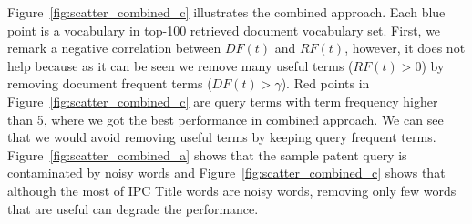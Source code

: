 Figure~\ref{fig:scatter_combined_c} illustrates the combined approach. Each blue point is a vocabulary in top-100 retrieved document vocabulary set. First, we remark a negative correlation between $\mathit{DF(t)}$ and $\mathit{RF(t)}$, however, it does not help because as it can be seen we remove many useful terms ($RF(t)>0$) by removing document frequent terms ($DF(t)>\gamma$). Red points in Figure~\ref{fig:scatter_combined_c} are query terms with term frequency higher than 5, where we got the best performance in combined approach. We can see that we would avoid removing useful terms by keeping query frequent terms. Figure~\ref{fig:scatter_combined_a} shows that the sample patent query is contaminated by noisy words and Figure~\ref{fig:scatter_combined_c} shows that although the most of IPC Title words are noisy words, removing only few words that are useful can degrade the performance.    
